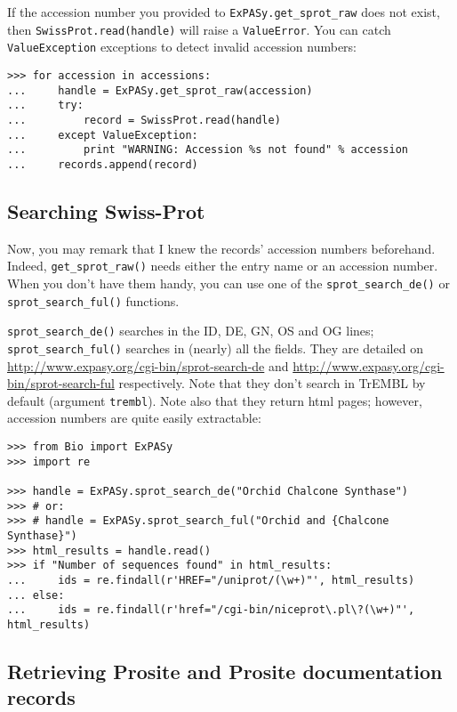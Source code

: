 \documentclass{report}
\begin{document}
If the accession number you provided to \verb|ExPASy.get_sprot_raw| does not exist, then \verb|SwissProt.read(handle)| will raise a \verb|ValueError|. You can catch \verb|ValueException| exceptions to detect invalid accession numbers:

\begin{verbatim}
>>> for accession in accessions:
...     handle = ExPASy.get_sprot_raw(accession)
...     try:
...         record = SwissProt.read(handle)
...     except ValueException:
...         print "WARNING: Accession %s not found" % accession
...     records.append(record)
\end{verbatim}

\subsection{Searching Swiss-Prot}

Now, you may remark that I knew the records' accession numbers
beforehand. Indeed, \verb|get_sprot_raw()| needs either the entry name
or an accession number. When you don't have them handy, you can use
one of the \verb|sprot_search_de()| or \verb|sprot_search_ful()|
functions.

\verb|sprot_search_de()| searches in the ID, DE, GN, OS and OG lines;
\verb|sprot_search_ful()| searches in (nearly) all the fields. They
are detailed on
\url{http://www.expasy.org/cgi-bin/sprot-search-de} and
\url{http://www.expasy.org/cgi-bin/sprot-search-ful}
respectively. Note that they don't search in TrEMBL by default
(argument \verb|trembl|). Note also that they return html pages;
however, accession numbers are quite easily extractable:

\begin{verbatim}
>>> from Bio import ExPASy
>>> import re

>>> handle = ExPASy.sprot_search_de("Orchid Chalcone Synthase")
>>> # or:
>>> # handle = ExPASy.sprot_search_ful("Orchid and {Chalcone Synthase}")
>>> html_results = handle.read()
>>> if "Number of sequences found" in html_results:
...     ids = re.findall(r'HREF="/uniprot/(\w+)"', html_results)
... else:
...     ids = re.findall(r'href="/cgi-bin/niceprot\.pl\?(\w+)"', html_results)
\end{verbatim}

\subsection{Retrieving Prosite and Prosite documentation records}
\end{document}
